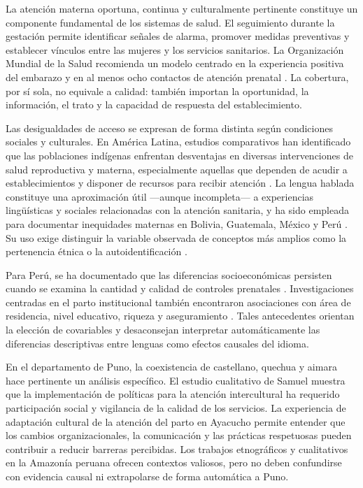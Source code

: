 \documentclass[
  spanish,
  letterpaper,
  conference]{IEEEtran}
\begin{document}
La atención materna oportuna, continua y culturalmente pertinente
constituye un componente fundamental de los sistemas de salud. El
seguimiento durante la gestación permite identificar señales de alarma,
promover medidas preventivas y establecer vínculos entre las mujeres y
los servicios sanitarios. La Organización Mundial de la Salud recomienda
un modelo centrado en la experiencia positiva del embarazo y en al menos
ocho contactos de atención prenatal \citep{oms2016}. La cobertura, por
sí sola, no equivale a calidad: también importan la oportunidad, la
información, el trato y la capacidad de respuesta del establecimiento.

Las desigualdades de acceso se expresan de forma distinta según
condiciones sociales y culturales. En América Latina, estudios
comparativos han identificado que las poblaciones indígenas enfrentan
desventajas en diversas intervenciones de salud reproductiva y materna,
especialmente aquellas que dependen de acudir a establecimientos y
disponer de recursos para recibir atención \citep{mesenburg2018}. La
lengua hablada constituye una aproximación útil ---aunque incompleta---
a experiencias lingüísticas y sociales relacionadas con la atención
sanitaria, y ha sido empleada para documentar inequidades maternas en
Bolivia, Guatemala, México y Perú \citep{armenta2019}. Su uso exige
distinguir la variable observada de conceptos más amplios como la
pertenencia étnica o la autoidentificación \citep{armenta2020}.

Para Perú, se ha documentado que las diferencias socioeconómicas
persisten cuando se examina la cantidad y calidad de controles
prenatales \citep{enriquez2022}. Investigaciones centradas en el parto
institucional también encontraron asociaciones con área de residencia,
nivel educativo, riqueza y aseguramiento \citep{rodrigo2023, ramos2023}.
Tales antecedentes orientan la elección de covariables y desaconsejan
interpretar automáticamente las diferencias descriptivas entre lenguas
como efectos causales del idioma.

En el departamento de Puno, la coexistencia de castellano, quechua y
aimara hace pertinente un análisis específico. El estudio cualitativo de
Samuel \citep{samuel2016} muestra que la implementación de políticas
para la atención intercultural ha requerido participación social y
vigilancia de la calidad de los servicios. La experiencia de adaptación
cultural de la atención del parto en Ayacucho \citep{gabrysch2009}
permite entender que los cambios organizacionales, la comunicación y las
prácticas respetuosas pueden contribuir a reducir barreras percibidas.
Los trabajos etnográficos y cualitativos en la Amazonía peruana
\citep{delmastro2021, mejia2025} ofrecen contextos valiosos, pero no
deben confundirse con evidencia causal ni extrapolarse de forma
automática a Puno.
\end{document}
